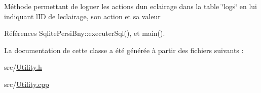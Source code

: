Méthode permettant de loguer les actions d\textquotesingle{}un eclairage dans la table \char`\"{}logs\char`\"{} en lui indiquant l\textquotesingle{}ID de l\textquotesingle{}eclairage, son action et sa valeur 

Références Sqlite\+Persi\+Bny\+::executer\+Sql(), et main().



La documentation de cette classe a été générée à partir des fichiers suivants \+:\begin{DoxyCompactItemize}
\item 
src/\hyperlink{Utility_8h}{Utility.\+h}\item 
src/\hyperlink{Utility_8cpp}{Utility.\+cpp}\end{DoxyCompactItemize}
